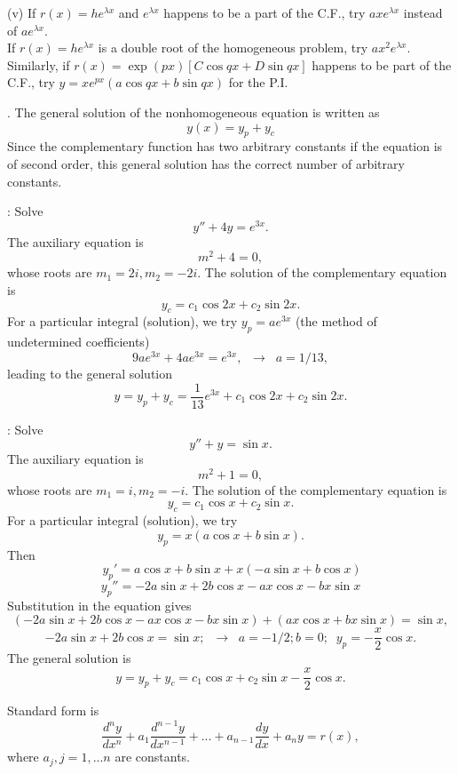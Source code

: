 \documentclass{article}
\begin{document}
\bigskip

(v) If $r(x) = h e^{\lambda x}$ and $e^{\lambda x}$ happens to be
a part of the C.F., try $a x e^{\lambda x}$ instead of $a
e^{\lambda x}$. \\
If $r(x) = he^{\lambda x}$ is a double root of the homogeneous
problem, try $a x^2 e^{\lambda x}$.\\
Similarly,  if $r(x)= \exp(px) [C \cos q x + D \sin q x]$ happens
to be part of the C.F., try $y = x e^{px} (a \cos q x + b \sin q
x)$ for the P.I.

\bigskip

. The general solution of the
nonhomogeneous equation is written as
$$
y(x)=y_p +y_c
$$
Since the complementary function has two arbitrary constants if
the equation is of second order, this general solution has the
correct number of arbitrary constants.

\hrulefill
\bigskip

: Solve
$$
y''+ 4 y= e^{3x}.
$$
The auxiliary equation is
$$
m^2+4=0,
$$
whose roots are $m_1=2i, m_2=-2i$. The solution of the
complementary equation is
$$
y_c=c_1 \cos 2 x + c_2 \sin 2 x.
$$
For a particular integral (solution), we try $ y_p= a e^{ 3x}$
(the method of undetermined coefficients)
$$
9 a e^{3x} + 4 a e^{3x} = e^{3 x}, \;\; \to \;\; a =1/13,
$$
leading to the general solution
$$
y=y_p+ y_c= \frac{1}{13} e^{3 x} + c_1 \cos 2 x + c_2 \sin 2 x.
$$


\bigskip
\hrulefill

: Solve
$$
y''+  y= \sin x.
$$
The auxiliary equation is
$$
m^2+1=0,
$$
whose roots are $m_1=i, m_2=-i$. The solution of the complementary
equation is
$$
y_c=c_1 \cos  x + c_2 \sin  x.
$$
For a particular integral (solution), we try
$$
y_p=x( a \cos x + b \sin x).
$$
Then
$$\
y_p'= a \cos x + b \sin x + x( -a \sin x + b \cos x)
$$
$$
y_p''= -2a \sin x + 2b \cos x  -a x \cos x - b x \sin x
$$
Substitution in the equation gives
$$
\left( -2a \sin x + 2b \cos x  -a x \cos x - b x \sin x \right) +
\left( a x \cos x + b x \sin x \right)= \sin x,
$$
$$
-2a \sin x + 2b \cos x  = \sin x; \;\; \to \;\; a= -1/2; b=0; \;\;
y_p= -\frac{x}{2} \cos x.
$$
The general solution is
$$
y=y_p+ y_c=  c_1 \cos  x + c_2 \sin  x  -\frac{x}{2} \cos x.
$$


\bigskip
\hrulefill

 Standard form is
$$
\frac{d^n y}{dx^n} + a_1 \frac{d^{n-1} y}{dx^{n-1}}+...+ a_{n-1}
\frac{d y}{dx}+  a_n y= r(x),
$$
where $ a_j, j=1,...n$ are  constants.
\end{document}
